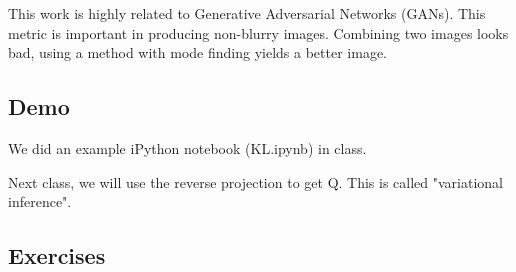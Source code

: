 \documentclass{article}
\begin{document}
\smallskip
This work is highly related to Generative Adversarial Networks (GANs). This metric is important in producing non-blurry images. Combining two images looks bad, using a method with mode finding yields a better image.

\subsection{Demo}

\smallskip
We did an example iPython notebook (KL.ipynb) in class.

\smallskip
Next class, we will use the reverse projection to get Q. This is called "variational inference".

\subsection{Exercises}
\end{document}
